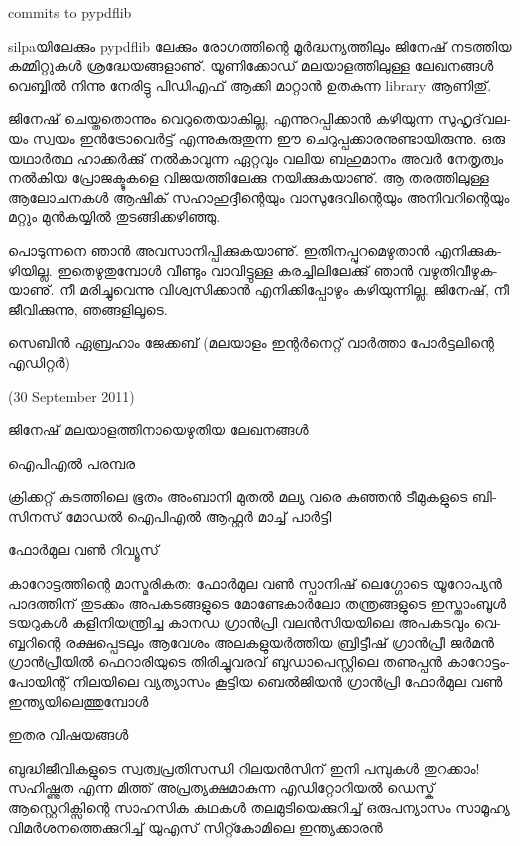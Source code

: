 commits to pypdflib

silpa­യി­ലേ­ക്കും pypdflib ലേ­ക്കും രോ­ഗ­ത്തി­ന്റെ മൂര്‍­ദ്ധ­ന്യ­ത്തി­ലും ജി­നേ­ഷ് നട­ത്തിയ കമ്മിറ്റുകള്‍ ശ്ര­ദ്ധേ­യ­ങ്ങ­ളാ­ണു്. യൂ­ണി­ക്കോ­ഡ് 
മല­യാ­ള­ത്തി­ലു­ള്ള ലേ­ഖ­ന­ങ്ങള്‍ വെ­ബ്ബില്‍ നി­ന്നു നേ­രി­ട്ടു ­പി­ഡി­എ­ഫ് ആക്കി മാ­റ്റാന്‍ ഉത­കു­ന്ന library ആണി­തു്.

­ജി­നേ­ഷ് ചെ­യ്ത­തൊ­ന്നും വെ­റു­തെ­യാ­കി­ല്ല, എന്നു­റ­പ്പി­ക്കാന്‍ കഴി­യു­ന്ന സു­ഹൃ­ദ്‌­വ­ല­യം സ്വ­യം ഇന്‍­ട്രോ­വെര്‍­ട്ട് എന്നു­കു­രു­തു­ന്ന 
ഈ ചെ­റു­പ്പ­ക്കാ­ര­നു­ണ്ടാ­യി­രു­ന്നു. ഒരു യഥാര്‍­ത്ഥ ഹാ­ക്കര്‍­ക്കു് നല്‍­കാ­വു­ന്ന ഏറ്റ­വും വലിയ ബഹു­മാ­നം അവര്‍ നേ­തൃ­ത്വം 
നല്‍­കിയ പ്രോ­ജ­ക്ടു­ക­ളെ വി­ജ­യ­ത്തി­ലേ­ക്കു നയി­ക്കു­ക­യാ­ണു്. ആ തര­ത്തി­ലു­ള്ള ആലോ­ച­ന­കള്‍ ആഷി­ക്‍ സഹാ­ഹു­ദ്ദീ­ന്റെ­യും 
വാ­സു­ദേ­വി­ന്റെ­യും അനി­വ­റി­ന്റെ­യും മറ്റും മുന്‍­ക­യ്യില്‍ തു­ട­ങ്ങി­ക്ക­ഴി­ഞ്ഞു­.

­പൊ­ടു­ന്ന­നെ ഞാന്‍ അവ­സാ­നി­പ്പി­ക്കു­ക­യാ­ണു്. ഇതി­ന­പ്പു­റ­മെ­ഴു­താന്‍ എനി­ക്കു­ക­ഴി­യി­ല്ല. ഇതെ­ഴു­തു­മ്പോള്‍ വീ­ണ്ടും വാ­വി­ട്ടു­ള്ള 
കര­ച്ചി­ലി­ലേ­ക്കു് ഞാന്‍ വഴു­തി­വീ­ഴു­ക­യാ­ണു്. നീ മരി­ച്ചു­വെ­ന്നു വി­ശ്വ­സി­ക്കാന്‍ എനി­ക്കി­പ്പോ­ഴും കഴി­യു­ന്നി­ല്ല. ജി­നേ­ഷ്, നീ ജീ­വി­ക്കു­ന്നു, 
ഞങ്ങ­ളി­ലൂ­ടെ­.

­സെ­ബിന്‍ ഏബ്ര­ഹാം ജേ­ക്ക­ബ് (മലയാളം ഇന്റര്‍നെറ്റ് വാര്‍ത്താ പോര്‍ട്ടലിന്റെ എഡിറ്റര്‍)

(30  September 2011)

­ജി­നേ­ഷ് മല­യാ­ള­ത്തി­നാ­യെ­ഴു­തിയ ലേ­ഖ­ന­ങ്ങള്‍

ഐ­പി­എല്‍ പര­മ്പ­ര

­ക്രി­ക്ക­റ്റ് കു­ട­ത്തി­ലെ ഭൂ­തം­
അം­ബാ­നി മു­തല്‍ മല്യ വരെ­
­കു­ഞ്ഞന്‍ ടീ­മു­ക­ളു­ടെ ബി­സി­ന­സ് മോ­ഡല്‍
ഐ­പി­എല്‍ ആഫ്റ്റര്‍ മാ­ച്ച് പാര്‍­ട്ടി­

­ഫോര്‍­മുല വണ്‍ റി­വ്യൂ­സ്

­കാ­റോ­ട്ട­ത്തി­ന്റെ മാ­സ്മ­രി­ക­ത: ഫോര്‍­മുല വണ്‍
­സ്പാ­നി­ഷ് ലെ­ഗ്ഗോ­ടെ യൂ­റോ­പ്യന്‍ പാ­ദ­ത്തി­ന് തു­ട­ക്കം­
അ­പ­ക­ട­ങ്ങ­ളു­ടെ മോ­ണ്ടേ­കാര്‍­ലോ­
­ത­ന്ത്ര­ങ്ങ­ളു­ടെ ഇസ്താം­ബൂള്‍
­ട­യ­റു­കള്‍ കളി­നി­യ­ന്ത്രി­ച്ച കാ­നഡ ഗ്രാന്‍­പ്രി­
­വ­ലന്‍­സി­യ­യി­ലെ അപ­ക­ട­വും വെ­ബ്ബ­റി­ന്റെ രക്ഷ­പ്പെ­ട­ലും­
ആ­വേ­ശം അല­ക­ളു­യര്‍­ത്തിയ ബ്രി­ട്ടീ­ഷ് ഗ്രാന്‍­പ്രീ­
­ജര്‍­മന്‍ ഗ്രാന്‍­പ്രീ­യില്‍ ഫെ­റാ­രി­യു­ടെ തി­രി­ച്ചു­വ­ര­വ്
­ബു­ഡാ­പെ­സ്റ്റി­ലെ തണു­പ്പന്‍ കാ­റോ­ട്ടം­
­പോ­യി­ന്റ് നി­ല­യി­ലെ വ്യ­ത്യാ­സം കൂ­ട്ടിയ ബെല്‍­ജി­യന്‍ ഗ്രാന്‍­പ്രി­
­ഫോര്‍­മുല വണ്‍ ഇന്ത്യ­യി­ലെ­ത്തു­മ്പോള്‍ 

ഇ­തര വി­ഷ­യ­ങ്ങള്‍

ബുദ്ധിജീവികളുടെ സ്വ­ത്വ­പ്ര­തി­സ­ന്ധി
റിലയന്‍സിന് ഇനി പമ്പു­കള്‍ തു­റ­ക്കാം­!
സഹിഷ്ണുത എന്ന മി­ത്ത്
അപ്രത്യക്ഷമാകുന്ന എഡി­റ്റോ­റി­യല്‍ ഡെ­സ്ക്
ആസ്റ്റെറിക്സിന്റെ സാ­ഹ­സിക കഥ­കള്‍
തലമുടിയെക്കുറിച്ച് ഒരു­പ­ന്യാ­സം
സാമൂഹ്യ വി­മര്‍­ശ­ന­ത്തെ­ക്കു­റി­ച്ച്
യുഎസ് സി­റ്റ്കോ­മി­ലെ ഇന്ത്യ­ക്കാ­രന്‍

